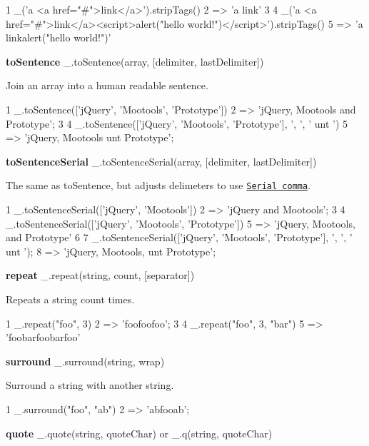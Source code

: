 \begin{DoxyCode}
1 \_('a <a href="#">link</a>').stripTags()
2 => 'a link'
3 
4 \_('a <a href="#">link</a><script>alert("hello world!")</script>').stripTags()
5 => 'a linkalert("hello world!")'
\end{DoxyCode}


{\bfseries to\+Sentence} \+\_\+.\+to\+Sentence(array, \mbox{[}delimiter, last\+Delimiter\mbox{]})

Join an array into a human readable sentence.


\begin{DoxyCode}
1 \_.toSentence(['jQuery', 'Mootools', 'Prototype'])
2 => 'jQuery, Mootools and Prototype';
3 
4 \_.toSentence(['jQuery', 'Mootools', 'Prototype'], ', ', ' unt ')
5 => 'jQuery, Mootools unt Prototype';
\end{DoxyCode}


{\bfseries to\+Sentence\+Serial} \+\_\+.\+to\+Sentence\+Serial(array, \mbox{[}delimiter, last\+Delimiter\mbox{]})

The same as {\ttfamily to\+Sentence}, but adjusts delimeters to use \href{http://en.wikipedia.org/wiki/Serial_comma}{\tt Serial comma}.


\begin{DoxyCode}
1 \_.toSentenceSerial(['jQuery', 'Mootools'])
2 => 'jQuery and Mootools';
3 
4 \_.toSentenceSerial(['jQuery', 'Mootools', 'Prototype'])
5 => 'jQuery, Mootools, and Prototype'
6 
7 \_.toSentenceSerial(['jQuery', 'Mootools', 'Prototype'], ', ', ' unt ');
8 => 'jQuery, Mootools, unt Prototype';
\end{DoxyCode}


{\bfseries repeat} \+\_\+.\+repeat(string, count, \mbox{[}separator\mbox{]})

Repeats a string count times.


\begin{DoxyCode}
1 \_.repeat("foo", 3)
2 => 'foofoofoo';
3 
4 \_.repeat("foo", 3, "bar")
5 => 'foobarfoobarfoo'
\end{DoxyCode}


{\bfseries surround} \+\_\+.\+surround(string, wrap)

Surround a string with another string.


\begin{DoxyCode}
1 \_.surround("foo", "ab")
2 => 'abfooab';
\end{DoxyCode}


{\bfseries quote} \+\_\+.\+quote(string, quote\+Char) or \+\_\+.\+q(string, quote\+Char)

